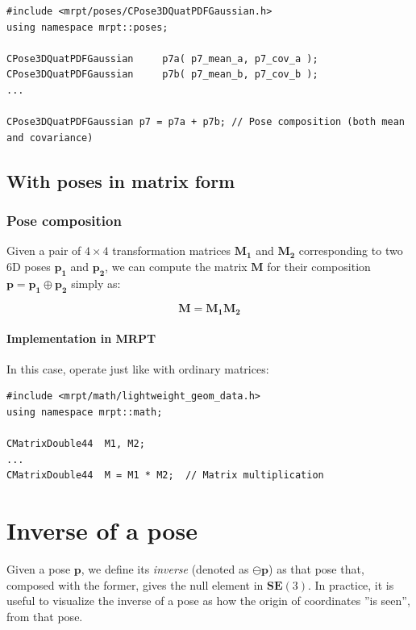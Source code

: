 \documentclass[a4paper,11pt]{report}
\begin{document}
\begin{lstlisting}
#include <mrpt/poses/CPose3DQuatPDFGaussian.h>
using namespace mrpt::poses;

CPose3DQuatPDFGaussian     p7a( p7_mean_a, p7_cov_a );
CPose3DQuatPDFGaussian     p7b( p7_mean_b, p7_cov_b );
...

CPose3DQuatPDFGaussian p7 = p7a + p7b; // Pose composition (both mean and covariance)
\end{lstlisting}




\section{With poses in matrix form}
\label{sect:comp_poses:mat}

\subsection{Pose composition}

Given a pair of $4\times 4$ transformation matrices
$\mathbf{M_1}$ and $\mathbf{M_2}$ corresponding to two 6D poses
$\mathbf{p_1}$ and $\mathbf{p_2}$, we can compute the
matrix $\mathbf{M}$ for their composition $\mathbf{p} = \mathbf{p_1} \oplus \mathbf{p_2}$
simply as:

\begin{equation}
\mathbf{M} =  \mathbf{M_1}  \mathbf{M_2}
\end{equation}

\subsubsection{Implementation in MRPT}

In this case, operate just like with ordinary matrices:

\begin{lstlisting}
#include <mrpt/math/lightweight_geom_data.h>
using namespace mrpt::math;

CMatrixDouble44  M1, M2;
...
CMatrixDouble44  M = M1 * M2;  // Matrix multiplication
\end{lstlisting}



\chapter{Inverse of a pose}
\label{sect:inverse}

Given a pose $\mathbf{p}$, we define its \emph{inverse}
(denoted as $\ominus \mathbf{p}$)
as that pose that, composed with the former, gives the null element
in $\mathbf{SE}(3)$.
In practice, it is useful to visualize the inverse of a pose as
how the origin of coordinates ''is seen'', from that pose.
\end{document}
